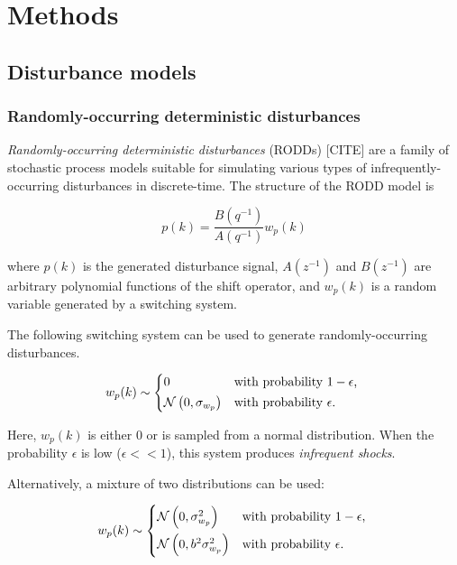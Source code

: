 \chapter{Methods}
\label{chap-methods}

\section{Disturbance models}

\subsection{Randomly-occurring deterministic disturbances}

\textit{Randomly-occurring deterministic disturbances} (RODDs) [CITE] are a family of stochastic process models suitable for simulating various types of infrequently-occurring disturbances in discrete-time.  The structure of the RODD model is

\begin{equation} \label{eq:RODD}
	p(k)= \frac{B(q^{-1})}{A(q^{-1})}w_p(k)
\end{equation}

where $p(k)$ is the generated disturbance signal, $A(z^{-1})$ and $B(z^{-1})$ are arbitrary polynomial functions of the shift operator, and $w_p(k)$ is a random variable generated by a switching system.

The following switching system can be used to generate randomly-occurring disturbances.

\begin{equation} \label{eq:alpha1}
w_p(k) \sim 
\begin{cases*}
	0 & with probability $1-\epsilon$, \\
	\mathcal{N}\left(0, \sigma_{w_p}\right) & with probability $\epsilon$.
\end{cases*}
\end{equation}

Here, $w_p(k)$ is either 0 or is sampled from a normal distribution.  When the probability $\epsilon$ is low ($\epsilon<<1$), this system produces \textit{infrequent shocks}.

Alternatively, a mixture of two distributions can be used:

\begin{equation} \label{eq:alpha2}
w_p(k) \sim 
	\begin{cases*}
		\mathcal{N}\left(0, \sigma_{w_p}^2\right) & with probability $1-\epsilon$, \\
		\mathcal{N}\left(0, b^2\sigma_{w_p}^2\right) & with probability $\epsilon$.
	\end{cases*}
\end{equation}

